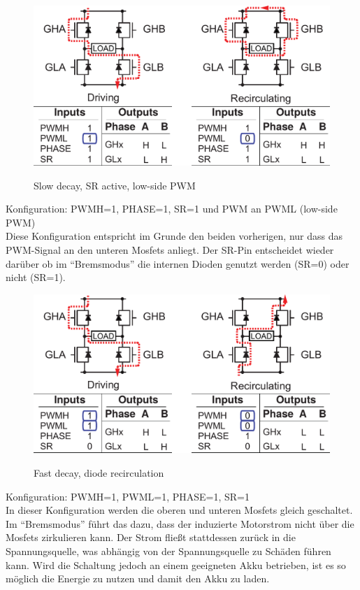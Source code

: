 \begin{figure}[H]
\centering
\includegraphics[width=.8\textwidth]{3941_3.png}\\
\caption{Slow decay, SR active, low-side PWM \cite{ds-A3941}}%
\label{fig:39413}
\end{figure}

Konfiguration: PWMH=1, PHASE=1, SR=1 und PWM an PWML (low-side PWM)\\
Diese Konfiguration entspricht im Grunde den beiden vorherigen, nur dass das PWM-Signal
an den unteren Mosfets anliegt. Der SR-Pin entscheidet wieder darüber ob im ``Bremsmodus''
die internen Dioden genutzt werden (SR=0) oder nicht (SR=1).




\begin{figure}[H]
\centering
\includegraphics[width=.8\textwidth]{3941_4.png}\\
\caption{Fast decay, diode recirculation \cite{ds-A3941}}%
\label{fig:39414}
\end{figure}


Konfiguration: PWMH=1, PWML=1, PHASE=1, SR=1\\
In dieser Konfiguration werden die oberen und unteren Mosfets gleich geschaltet. Im
``Bremsmodus'' führt das dazu, dass der induzierte Motorstrom nicht über die Mosfets
zirkulieren kann. Der Strom fließt stattdessen zurück in die Spannungsquelle, was
abhängig von der Spannungsquelle zu Schäden führen kann. Wird die Schaltung jedoch an
einem geeigneten Akku betrieben, ist es so möglich die Energie zu nutzen und damit den Akku
zu laden.

